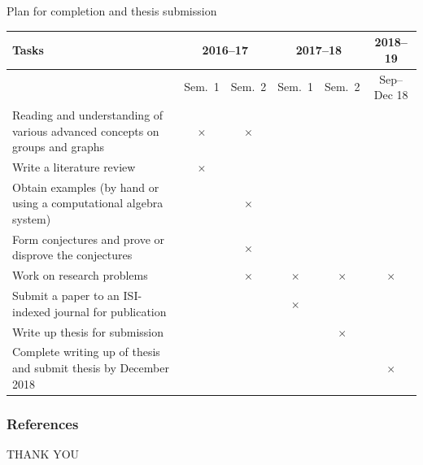\documentclass[aspectratio=169,mathserif]{beamer}
\begin{document}
\begin{frame}{Plan for completion and thesis submission}
\footnotesize
\setlength\tabcolsep{4pt} %
\begin{tabularx}{\textwidth}{@{}>{\RaggedRight}X*{5}{c}@{}}
\toprule
Tasks & \multicolumn{2}{c}{2016--17} & \multicolumn{2}{c}{2017--18} & 2018--19\\
\cmidrule(l){2-6}
& {\tiny Sem.\ 1} & {\tiny Sem.\ 2} & {\tiny Sem.\ 1} & {\tiny Sem.\ 2} & {\tiny Sep--Dec 18} \\
\midrule
Reading and understanding of various advanced concepts on groups and graphs 
& $\times$ & $\times$  \\
\addlinespace
Write a literature review 
& $\times$ \\
\addlinespace
Obtain examples (by hand or using a computational algebra system)    
& & $\times$ \\
\addlinespace
Form conjectures and prove or disprove the conjectures 
& & $\times$ \\
\addlinespace
Work on research problems 
& & $\times$ &$\times$ & $\times$ & $\times$ \\
\addlinespace
Submit a paper to an ISI-indexed journal for publication
& & & $\times$ \\ 
\addlinespace
Write up thesis for submission 
& & & &$\times$ \\
\addlinespace
Complete writing up of thesis and submit thesis by December 2018 
& & & & & $\times$ \\
\bottomrule
\end{tabularx}
\end{frame}
\begin{frame}[allowframebreaks]
\def\newblock{}
\frametitle{References}
  
  
\end{frame}
\begin{frame}
\Huge{\centerline{THANK YOU}}
\end{frame}
\end{document}
